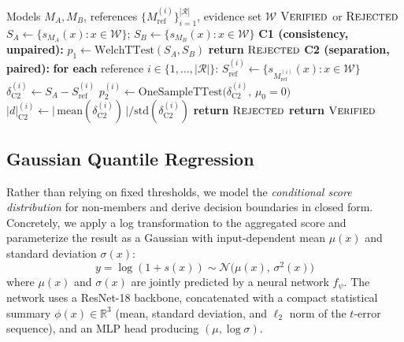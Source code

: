\documentclass{article}
\begin{document}
\begin{algorithm}[t]
\caption{Ownership Verification Protocol}
\label{alg:verification}
\begin{algorithmic}
\REQUIRE Models $M_A, M_B$, references $\{M_{\text{ref}}^{(i)}\}_{i=1}^{|\mathcal{R}|}$, evidence set $\mathcal{W}$
\ENSURE $\textsc{Verified}$ or $\textsc{Rejected}$
\STATE $S_A \leftarrow \{s_{M_A}(x) : x \in \mathcal{W}\}$; \quad $S_B \leftarrow \{s_{M_B}(x) : x \in \mathcal{W}\}$
\STATE \textbf{C1 (consistency, unpaired):} $p_1 \leftarrow \text{WelchTTest}(S_A, S_B)$
 \STATE \textbf{return} $\textsc{Rejected}$ \ENDIF
\STATE \textbf{C2 (separation, paired):} \textbf{for each} reference $i \in \{1, \ldots, |\mathcal{R}|\}$:
\STATE \quad $S_{\text{ref}}^{(i)} \leftarrow \{s_{M_{\text{ref}}^{(i)}}(x) : x \in \mathcal{W}\}$
\STATE \quad $\delta_{\text{C2}}^{(i)} \leftarrow S_A - S_{\text{ref}}^{(i)}$ 
\STATE \quad $p_2^{(i)} \leftarrow \text{OneSampleTTest}\bigl(\delta_{\text{C2}}^{(i)},\, \mu_0 = 0\bigr)$
\STATE \quad $|d|_{\text{C2}}^{(i)} \leftarrow \bigl|\,\text{mean}(\delta_{\text{C2}}^{(i)})\,\bigr| \big/ \text{std}(\delta_{\text{C2}}^{(i)})$
    \STATE \textbf{return} $\textsc{Rejected}$
\ENDIF
\STATE \textbf{return} $\textsc{Verified}$
\end{algorithmic}
\end{algorithm}

\subsection{Gaussian Quantile Regression}
\label{sec:gaussian_qr}

Rather than relying on fixed thresholds, we model the \emph{conditional score distribution} for non-members and derive decision boundaries in closed form. Concretely, we apply a log transformation to the aggregated score and parameterize the result as a Gaussian with input-dependent mean $\mu(x)$ and standard deviation $\sigma(x)$:
\begin{equation}
y = \log(1 + s(x)) \sim \mathcal{N}\!\bigl(\mu(x),\, \sigma^2(x)\bigr)
\end{equation}
where $\mu(x)$ and $\sigma(x)$ are jointly predicted by a neural network $f_\psi$. The network uses a ResNet-18 backbone, concatenated with a compact 
statistical summary $\phi(x) \in \mathbb{R}^3$ (mean, standard 
deviation, and $\ell_2$ norm of the $t$-error sequence), and an 
MLP head producing $(\mu, \log\sigma)$.
\end{document}
